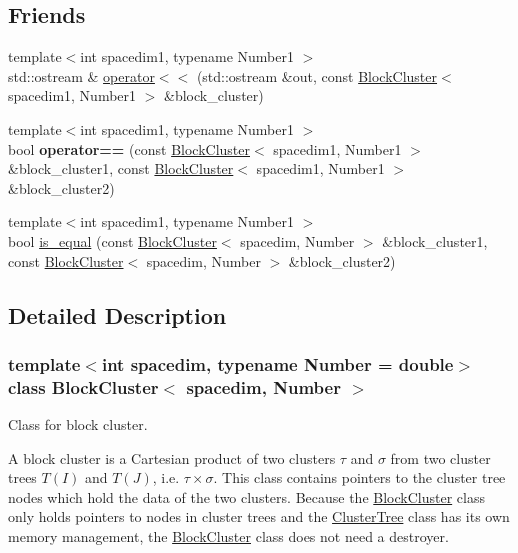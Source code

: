 \subsection*{Friends}
\begin{DoxyCompactItemize}
\item 
{\footnotesize template$<$int spacedim1, typename Number1 $>$ }\\std\+::ostream \& \hyperlink{classBlockCluster_a9721dfd2e13c7fc896f6f1e9e1c1ed04}{operator$<$$<$} (std\+::ostream \&out, const \hyperlink{classBlockCluster}{Block\+Cluster}$<$ spacedim1, Number1 $>$ \&block\+\_\+cluster)
\item 
\mbox{\label{classBlockCluster_a8695eab8c2364aee31a7f0d93f666b1c}} 
{\footnotesize template$<$int spacedim1, typename Number1 $>$ }\\bool {\bfseries operator==} (const \hyperlink{classBlockCluster}{Block\+Cluster}$<$ spacedim1, Number1 $>$ \&block\+\_\+cluster1, const \hyperlink{classBlockCluster}{Block\+Cluster}$<$ spacedim1, Number1 $>$ \&block\+\_\+cluster2)
\item 
{\footnotesize template$<$int spacedim1, typename Number1 $>$ }\\bool \hyperlink{classBlockCluster_a770daa1c7399aa72cfb7e1e7dc65b6bb}{is\+\_\+equal} (const \hyperlink{classBlockCluster}{Block\+Cluster}$<$ spacedim, Number $>$ \&block\+\_\+cluster1, const \hyperlink{classBlockCluster}{Block\+Cluster}$<$ spacedim, Number $>$ \&block\+\_\+cluster2)
\end{DoxyCompactItemize}


\subsection{Detailed Description}
\subsubsection*{template$<$int spacedim, typename Number = double$>$\newline
class Block\+Cluster$<$ spacedim, Number $>$}

Class for block cluster. 

A block cluster is a Cartesian product of two clusters $\tau$ and $\sigma$ from two cluster trees $T(I)$ and $T(J)$, i.\+e. $\tau \times \sigma$. This class contains pointers to the cluster tree nodes which hold the data of the two clusters. Because the \hyperlink{classBlockCluster}{Block\+Cluster} class only holds pointers to nodes in cluster trees and the \hyperlink{classClusterTree}{Cluster\+Tree} class has its own memory management, the \hyperlink{classBlockCluster}{Block\+Cluster} class does not need a destroyer. 

